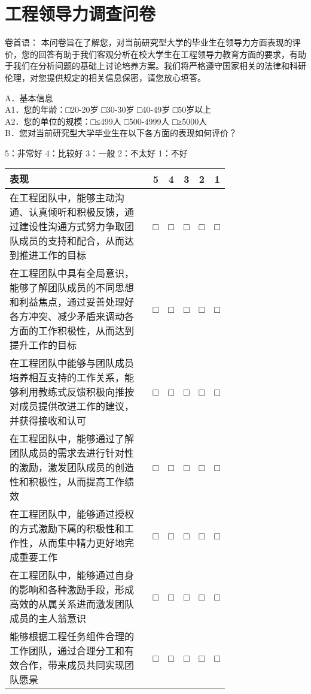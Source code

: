 \documentclass[degree=doctor]{thuthesis}
\begin{document}
\START
\showoutput

\appendix

\setcounter{page}{115}
\chapter{工程领导力调查问卷}

卷首语：
本问卷旨在了解您，对当前研究型大学的毕业生在领导力方面表现的评价，您的回答有助于我们客观分析在校大学生在工程领导力教育方面的要求，有助于我们在分析问题的基础上讨论培养方案。我们将严格遵守国家相关的法律和科研伦理，对您提供规定的相关信息保密，请您放心填答。

\null\par

\noindent A．基本信息 \\
A1．您的年龄：□20-20岁 □30-30岁 □40-49岁 □50岁以上 \\
A2．您的单位的规模：□≤499人 □500-4999人 □≥5000人 \\
B．您对当前研究型大学毕业生在以下各方面的表现如何评价？

5：非常好 4：比较好 3：一般 2：不太好 1：不好 \\
\begin{tabular}{|p{0.73\linewidth}|ccccc|}
  \hline
  \centering 表现 & 5 & 4 & 3 & 2 & 1 \\
  \hline
  在工程团队中，能够主动沟通、认真倾听和积极反馈，通过建设性沟通方式努力争取团队成员的支持和配合，从而达到推进工作的目标 & □ & □ & □ & □ & □ \\
  \hline
  在工程团队中具有全局意识，能够了解团队成员的不同思想和利益焦点，通过妥善处理好各方冲突、减少矛盾来调动各方面的工作积极性，从而达到提升工作的目标 & □ & □ & □ & □ & □ \\
  \hline
  在工程团队中能够与团队成员培养相互支持的工作关系，能够利用教练式反馈积极向推按对成员提供改进工作的建议，并获得接收和认可 & □ & □ & □ & □ & □ \\
  \hline
  在工程团队中，能够通过了解团队成员的需求去进行针对性的激励，激发团队成员的创造性和积极性，从而提高工作绩效 & □ & □ & □ & □ & □ \\
  \hline
  在工程团队中，能够通过授权的方式激励下属的积极性和工作性，从而集中精力更好地完成重要工作 & □ & □ & □ & □ & □ \\
  \hline
  在工程团队中，能够通过自身的影响和各种激励手段，形成高效的从属关系进而激发团队成员的主人翁意识 & □ & □ & □ & □ & □ \\
  \hline
  能够根据工程任务组件合理的工作团队，通过合理分工和有效合作，带来成员共同实现团队愿景 & □ & □ & □ & □ & □ \\
  \hline
\end{tabular}


\clearpage
\OMIT
\end{document}
